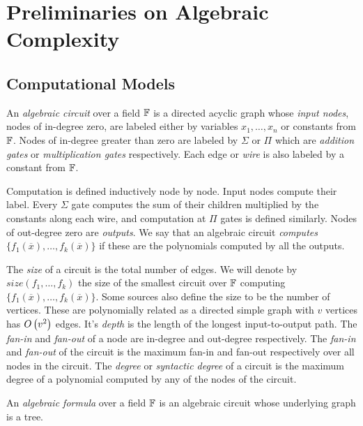 \documentclass[letterpaper, 11pt]{amsart}
\newif\iffull
\begin{document}
\section{Preliminaries on Algebraic Complexity}

\subsection{Computational Models}

\begin{defn}\label{defn:ckt}
  An \emph{algebraic circuit} over a field $\mathbb{F}$ is a directed acyclic graph whose \emph{input nodes}, nodes of in-degree zero, are labeled either by variables $x_1, \ldots, x_n$ or constants from $\mathbb{F}$.
  Nodes of in-degree greater than zero are labeled by $\Sigma$ or $\Pi$ which are \emph{addition gates} or \emph{multiplication gates} respectively.
  Each edge or \emph{wire} is also labeled by a constant from $\mathbb{F}$.

  Computation is defined inductively node by node.
  Input nodes compute their label.
  Every $\Sigma$ gate computes the sum of their children multiplied by the constants along each wire, and computation at $\Pi$ gates is defined similarly.
  Nodes of out-degree zero are \emph{outputs}.
  We say that an algebraic circuit \emph{computes} $\{f_1(\overline{x}), \ldots, f_k(\overline{x})\}$ if these are the polynomials computed by all the outputs.

  The \emph{size} of a circuit is the total number of edges.
  We will denote by $size(f_1, \ldots, f_k)$ the size of the smallest circuit over $\mathbb{F}$ computing $\{f_1(\overline{x}), \ldots, f_k(\overline{x})\}$.
  Some sources also define the size to be the number of vertices.
  These are polynomially related as a directed simple graph with $v$ vertices has $O\kern-0.0pt\left(v^2\right)$ edges.
  It's \emph{depth} is the length of the longest input-to-output path.
  The \emph{fan-in} and \emph{fan-out} of a node are in-degree and out-degree respectively.
  The \emph{fan-in} and \emph{fan-out} of the circuit is the maximum fan-in and fan-out respectively over all nodes in the circuit.
  The \emph{degree} or \emph{syntactic degree} of a circuit is the maximum degree of a polynomial computed by any of the nodes of the circuit.
\end{defn}

\iffull
\begin{defn}\label{defn:formula}
  An \emph{algebraic formula} over a field $\mathbb{F}$ is an algebraic circuit whose underlying graph is a tree.
\end{defn}
\end{document}
